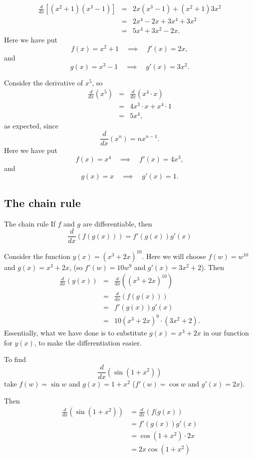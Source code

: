 \begin{example}
\begin{eqnarray*}
\frac{d}{dx}\left[ (x^2+1)(x^3-1) \right] &=& 2x(x^3-1) + (x^2+1)3x^2 \\
&=& 2x^4-2x+3x^4+3x^2 \\
&=& 5x^4 + 3x^2 - 2x.
\end{eqnarray*}
Here we have put 
\[f(x)=x^2+1\quad \implies \quad f'(x)=2x,\]
and
\[g(x)=x^3-1\quad \implies \quad g'(x)=3x^2.\]
\end{example}

\begin{example}
Consider the derivative of $x^5$, so
\begin{eqnarray*}
\frac{d}{dx}\left(x^5\right) &=& \frac{d}{dx}\left(x^4\cdot x\right)\\
&=& 4x^3\cdot x + x^4\cdot1\\
&=& 5x^4,
\end{eqnarray*}
as expected, since
\[\frac{d}{dx}\left(x^n\right)=nx^{n-1}.\]
Here we have put
\[f(x)=x^4 \quad \implies \quad f'(x)=4x^3,\]
and
\[g(x)=x\quad \implies \quad g'(x)=1.\]
\end{example}

\subsection{The chain rule}
\begin{thing}{The chain rule}
If $f$ and $g$ are differentiable, then
\[\frac{d}{dx}\left( f(g(x) ) \right) = f'(g(x))g'(x)\]
\end{thing}

\begin{example}
Consider the function $y(x)=(x^3+2x)^{10}$. Here we will choose $f(w)=w^{10}$ and $g(x)=x^3+2x$, (so $f'(w)=10w^9$ and $g'(x)=3x^2+2$). Then
\begin{eqnarray*}
\frac{d}{dx}\left(y(x)\right)&=& \frac{d}{dx}\left( (x^3+2x)^{10} \right) \\ 
&=& \frac{d}{dx}\left( f(g(x)) \right) \\
&=&f'(g(x))g'(x) \\
&=&10(x^3+2x)^9\cdot  (3x^2+2).
\end{eqnarray*}
Essentially, what we have done is to substitute $g(x)=x^3+2x$ in our function for $y(x)$, to make the differentiation easier.
\end{example} 

\begin{example}
To find $$\frac{d}{dx}\left(\sin(1+x^2)\right)$$ take $f(w)=\sin w$ and $g(x)=1+x^2$ ($f'(w)=\cos w$ and $g'(x)=2x$).

Then
\begin{align*}
\frac{d}{dx}\left(\sin(1+x^2)\right)&=\frac{d}{dx}\left(f(g(x)\right)\\
&=f'(g(x))g'(x)\\
&=\cos(1+x^2)\cdot2x\\
&=2x\cos(1+x^2)
\end{align*}
\end{example}
